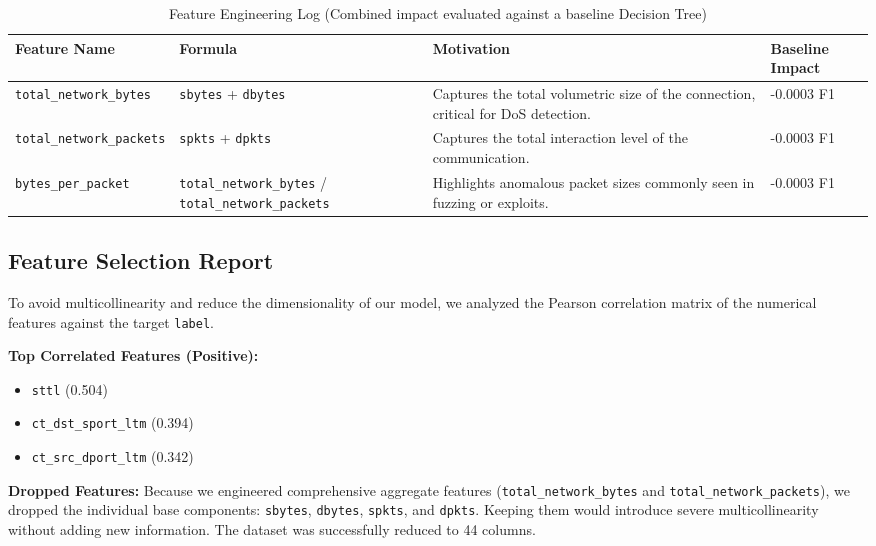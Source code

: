 \documentclass[12pt, a4paper]{article}
\begin{document}
\begin{table}[h]
\centering
\small
\setlength{\tabcolsep}{4pt}
\begin{tabular}{|p{}|p{}|p{}|p{}|}
\hline
\textbf{Feature Name} & \textbf{Formula} & \textbf{Motivation} & \textbf{Baseline Impact} \\
\hline
\texttt{total\_network\_bytes} & \texttt{sbytes} + \texttt{dbytes} & Captures the total volumetric size of the connection, critical for DoS detection. & -0.0003 F1 \\
\hline
\texttt{total\_network\_packets} & \texttt{spkts} + \texttt{dpkts} & Captures the total interaction level of the communication. & -0.0003 F1 \\
\hline
\texttt{bytes\_per\_packet} & \texttt{total\_network\_bytes} \newline / \texttt{total\_network\_packets} & Highlights anomalous packet sizes commonly seen in fuzzing or exploits. & -0.0003 F1 \\
\hline
\end{tabular}
\caption{Feature Engineering Log (Combined impact evaluated against a baseline Decision Tree)}
\label{tab:feature_eng_log}
\end{table}

\subsection{Feature Selection Report}
To avoid multicollinearity and reduce the dimensionality of our model, we analyzed the Pearson correlation matrix of the numerical features against the target \texttt{label}.

\textbf{Top Correlated Features (Positive):}
\begin{itemize}
    \item \texttt{sttl} (0.504)
    \item \texttt{ct\_dst\_sport\_ltm} (0.394)
    \item \texttt{ct\_src\_dport\_ltm} (0.342)
\end{itemize}

\textbf{Dropped Features:}
Because we engineered comprehensive aggregate features \newline (\texttt{total\_network\_bytes} and \texttt{total\_network\_packets}), we dropped the individual base components: \texttt{sbytes}, \texttt{dbytes}, \texttt{spkts}, and \texttt{dpkts}. Keeping them would introduce severe multicollinearity without adding new information. The dataset was successfully reduced to 44 columns.
\end{document}
